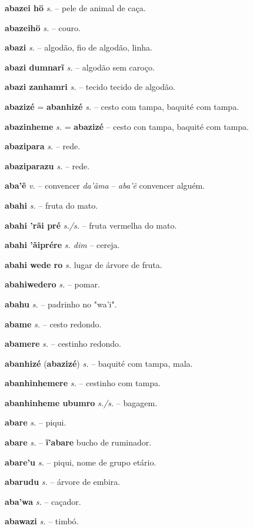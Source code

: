 \textbf{abazei hö} \textit{s.} -- pele de animal de caça.

\textbf{abazeihö} \textit{s.} -- couro.

\textbf{abazi} \textit{s.} -- algodão, fio de algodão, linha.

\textbf{abazi dumnarĩ} \textit{s.} -- algodão sem caroço.

\textbf{abazi zanhamri} \textit{s.} -- tecido tecido de algodão.

\textbf{abazizé} = \textbf{abanhizé} \textit{s.} -- cesto com tampa, baquité com tampa.

\textbf{abazinheme} \textit{s.} = \textbf{abazizé} -- cesto con tampa, baquité com tampa.

\textbf{abazipara} \textit{s.} -- rede.

\textbf{abaziparazu} \textit{s.} -- rede.

\textbf{aba'ẽ} \textit{v.} -- convencer  \textit{da'ãma} -- \textit{aba'ẽ} convencer alguém.

\textbf{abahi} \textit{s.} -- fruta do mato.

\textbf{abahi 'rãi pré} \textit{s./s.} -- fruta vermelha do mato.

\textbf{abahi 'ãiprére} \textit{s. dim} -- cereja.

\textbf{abahi wede ro} \textit{s.} lugar de árvore de fruta.

\textbf{abahiwedero} \textit{s.} -- pomar.

\textbf{abahu} \textit{s.} -- padrinho no "wa'i".

\textbf{abame} \textit{s.} -- cesto redondo.

\textbf{abamere} \textit{s.} -- cestinho redondo.

\textbf{abanhizé} (\textbf{abazizé}) \textit{s.} --  baquité com tampa, mala.

\textbf{abanhinhemere} \textit{s.} -- cestinho com tampa.

\textbf{abanhinheme ubumro} \textit{s./s.} -- bagagem.

\textbf{abare} \textit{s.} -- piqui.

\textbf{abare} \textit{s.} -- \textbf{ĩ'abare} bucho de ruminador.

\textbf{abare'u} \textit{s.} -- piqui,  nome de grupo etário.

\textbf{abarudu} \textit{s.} -- árvore de embira.

\textbf{aba'wa} \textit{s.} -- caçador.

\textbf{abawazi} \textit{s.} -- timbó.

